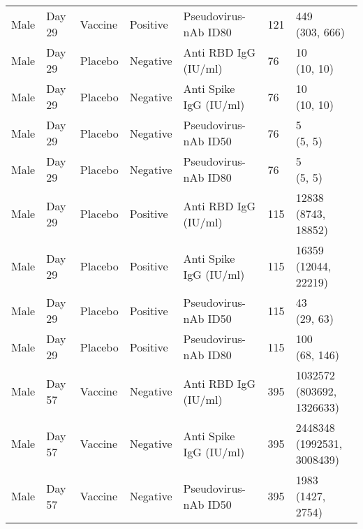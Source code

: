 \documentclass[]{book}
\theoremstyle{definition}
\theoremstyle{definition}
\theoremstyle{definition}
\newcommand{\1}{\mathbbm{1}}
\begin{document}
\begin{landscape}
\begin{ThreePartTable}
\begin{longtable}[t]{>{\raggedright\arraybackslash}p{7cm}llllll}
\hspace{1em}Male & Day 29 & Vaccine & Positive & Pseudovirus-nAb ID80 & 121 & \makecell[l]{449\\(303, 666)}\\
\hspace{1em}Male & Day 29 & Placebo & Negative & Anti RBD IgG (IU/ml) & 76 & \makecell[l]{10\\(10, 10)}\\
\hspace{1em}Male & Day 29 & Placebo & Negative & Anti Spike IgG (IU/ml) & 76 & \makecell[l]{10\\(10, 10)}\\
\hspace{1em}Male & Day 29 & Placebo & Negative & Pseudovirus-nAb ID50 & 76 & \makecell[l]{5\\(5, 5)}\\
\hspace{1em}Male & Day 29 & Placebo & Negative & Pseudovirus-nAb ID80 & 76 & \makecell[l]{5\\(5, 5)}\\
\hspace{1em}Male & Day 29 & Placebo & Positive & Anti RBD IgG (IU/ml) & 115 & \makecell[l]{12838\\(8743, 18852)}\\
\hspace{1em}Male & Day 29 & Placebo & Positive & Anti Spike IgG (IU/ml) & 115 & \makecell[l]{16359\\(12044, 22219)}\\
\hspace{1em}Male & Day 29 & Placebo & Positive & Pseudovirus-nAb ID50 & 115 & \makecell[l]{43\\(29, 63)}\\
\hspace{1em}Male & Day 29 & Placebo & Positive & Pseudovirus-nAb ID80 & 115 & \makecell[l]{100\\(68, 146)}\\
\hspace{1em}Male & Day 57 & Vaccine & Negative & Anti RBD IgG (IU/ml) & 395 & \makecell[l]{1032572\\(803692, 1326633)}\\
\hspace{1em}Male & Day 57 & Vaccine & Negative & Anti Spike IgG (IU/ml) & 395 & \makecell[l]{2448348\\(1992531, 3008439)}\\
\hspace{1em}Male & Day 57 & Vaccine & Negative & Pseudovirus-nAb ID50 & 395 & \makecell[l]{1983\\(1427, 2754)}\\

\end{longtable}
\end{ThreePartTable}
\end{landscape}
\end{document}

